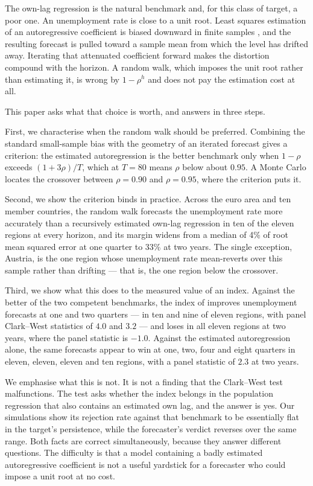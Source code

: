 \documentclass[12pt]{article}
\begin{document}
The own-lag regression is the natural benchmark and, for this class of target,
a poor one. An unemployment rate is close to a unit root. Least squares
estimation of an autoregressive coefficient is biased downward in finite
samples \citep{marriott1954, kendall1954}, and the resulting forecast is pulled
toward a sample mean from which the level has drifted away. Iterating that
attenuated coefficient forward makes the distortion compound with the horizon.
A random walk, which imposes the unit root rather than estimating it, is wrong
by $1-\rho^h$ and does not pay the estimation cost at all.

This paper asks what that choice is worth, and answers in three steps.

First, we characterise when the random walk should be preferred. Combining the
standard small-sample bias with the geometry of an iterated forecast gives a
criterion: the estimated autoregression is the better benchmark only when
$1-\rho$ exceeds $(1+3\rho)/T$, which at $T = 80$ means $\rho$ below about
$0.95$. A Monte Carlo locates the crossover between $\rho = 0.90$ and
$\rho = 0.95$, where the criterion puts it.

Second, we show the criterion binds in practice. Across the euro area and ten
member countries, the random walk forecasts the unemployment rate more
accurately than a recursively estimated own-lag regression in ten of the eleven
regions at every horizon, and its margin widens from a median of 4\% of root
mean squared error at one quarter to 33\% at two years. The single exception,
Austria, is the one region whose unemployment rate mean-reverts over this
sample rather than drifting --- that is, the one region below the crossover.

Third, we show what this does to the measured value of an index. Against the
better of the two competent benchmarks, the index of \citet{koop2014} improves
unemployment forecasts at one and two quarters --- in ten and nine of eleven
regions, with panel Clark--West statistics of $4.0$ and $3.2$ --- and loses in
all eleven regions at two years, where the panel statistic is $-1.0$. Against
the estimated autoregression alone, the same forecasts appear to win at one,
two, four and eight quarters in eleven, eleven, eleven and ten regions, with a
panel statistic of $2.3$ at two years.

We emphasise what this is not. It is not a finding that the Clark--West test
malfunctions. The test asks whether the index belongs in the population
regression that also contains an estimated own lag, and the answer is yes. Our
simulations show its rejection rate against that benchmark to be essentially
flat in the target's persistence, while the forecaster's verdict reverses over
the same range. Both facts are correct simultaneously, because they answer
different questions. The difficulty is that a model containing a badly
estimated autoregressive coefficient is not a useful yardstick for a forecaster
who could impose a unit root at no cost.
\end{document}
